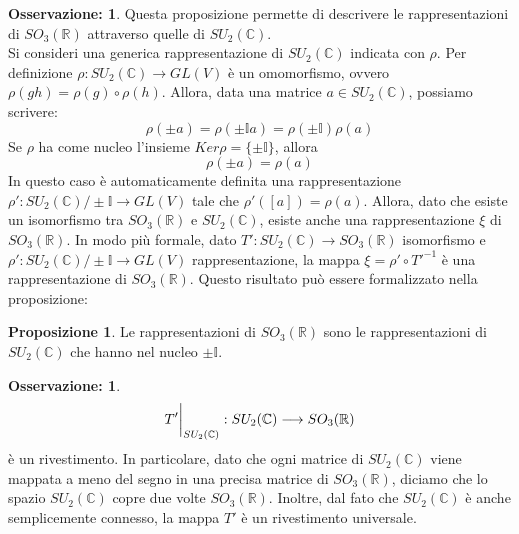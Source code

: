 \documentclass[12pt,a4paper]{report}
\theoremstyle{definition}
\theoremstyle{Theorem}
\newtheorem{Prop}[Def]{Proposizione}
\theoremstyle{definition}
\theoremstyle{definition}
\theoremstyle{definition}
\newtheorem{Obs}[Def]{Osservazione:}
\begin{document}
\begin{Obs}
	Questa proposizione permette di descrivere le rappresentazioni di $SO_3(\mathbb{R})$ attraverso quelle di $SU_2(\mathbb{C})$. \\
	Si consideri una generica rappresentazione di $SU_2(\mathbb{C})$ indicata con $\rho$. Per definizione $\rho:SU_2(\mathbb{C})\rightarrow GL(V)$ è un omomorfismo, ovvero $\rho(gh)=\rho(g)\circ\rho(h)$. Allora, data una matrice $a\in SU_2(\mathbb{C})$, possiamo scrivere:
	$$\rho(\pm a)=\rho(\pm \mathbb{I}a)=\rho(\pm\mathbb{I})\rho(a)$$
	Se $\rho$ ha come nucleo l'insieme $Ker\rho=\{\pm\mathbb{I}\}$, allora
	$$\rho(\pm a)=\rho(a)$$
	In questo caso è automaticamente definita una rappresentazione $\rho':SU_2(\mathbb{C})/\pm\mathbb{I}\longrightarrow GL(V)$ tale che $\rho'([a])=\rho(a)$.
	Allora, dato che esiste un isomorfismo tra $SO_3(\mathbb{R})$ e $SU_2(\mathbb{C})$, esiste anche una rappresentazione $\xi$ di $SO_3(\mathbb{R})$. In modo più formale, dato $T':SU_2(\mathbb{C})\rightarrow SO_3(\mathbb{R})$ isomorfismo e $\rho':SU_2(\mathbb{C})/\pm\mathbb{I}\longrightarrow GL(V)$ rappresentazione, la mappa $\xi=\rho'\circ T'^{-1}$ è una rappresentazione di $SO_3(\mathbb{R})$.
	Questo risultato può essere formalizzato nella proposizione:
\end{Obs}
\begin{Prop}
	Le rappresentazioni di $SO_3(\mathbb{R})$ sono le rappresentazioni di $SU_2(\mathbb{C})$ che hanno nel nucleo $\pm\mathbb{I}$. 
\end{Prop}
\begin{Obs}
	 $$T'\bigg{\rvert}_{SU_2(\mathbb{C})}:SU_2(\mathbb{C})\longrightarrow SO_3(\mathbb{R})$$
	 è un rivestimento. In particolare, dato che ogni matrice di $SU_2(\mathbb{C})$ viene mappata a meno del segno in una precisa matrice di $SO_3(\mathbb{R})$, diciamo che lo spazio $SU_2(\mathbb{C})$ copre due volte $SO_3(\mathbb{R})$. Inoltre, dal fato che $SU_2(\mathbb{C})$ è anche semplicemente connesso, la mappa $T'$ è un rivestimento universale.
\end{Obs}
\end{document}
